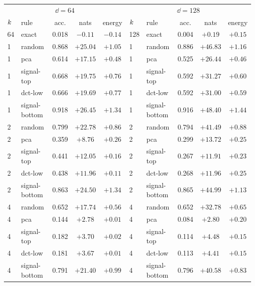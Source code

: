 \begin{center}
\small
\begin{tabular}{llccc|llccc}
\toprule
\multicolumn{5}{c|}{$\dd = 64$} & \multicolumn{5}{c}{$\dd = 128$} \\
$k$ & rule & acc. & nats & energy & $k$ & rule & acc. & nats & energy \\
\midrule
64 & exact         & 0.018 & $-0.11$ & $-0.14$ & 128 & exact         & 0.004 & $+0.19$ & $+0.15$ \\
\midrule
1 & random        & 0.868 & $+25.04$ & $+1.05$ & 1 & random        & 0.886 & $+46.83$ & $+1.16$ \\
1 & pca           & 0.614 & $+17.15$ & $+0.48$ & 1 & pca           & 0.525 & $+26.44$ & $+0.46$ \\
1 & signal-top    & 0.668 & $+19.75$ & $+0.76$ & 1 & signal-top    & 0.592 & $+31.27$ & $+0.60$ \\
1 & dct-low       & 0.666 & $+19.69$ & $+0.77$ & 1 & dct-low       & 0.592 & $+31.00$ & $+0.59$ \\
1 & signal-bottom & 0.918 & $+26.45$ & $+1.34$ & 1 & signal-bottom & 0.916 & $+48.40$ & $+1.44$ \\
\midrule
2 & random        & 0.799 & $+22.78$ & $+0.86$ & 2 & random        & 0.794 & $+41.49$ & $+0.88$ \\
2 & pca           & 0.359 & $+8.76$ & $+0.26$ & 2 & pca           & 0.299 & $+13.72$ & $+0.25$ \\
2 & signal-top    & 0.441 & $+12.05$ & $+0.16$ & 2 & signal-top    & 0.267 & $+11.91$ & $+0.23$ \\
2 & dct-low       & 0.438 & $+11.96$ & $+0.11$ & 2 & dct-low       & 0.268 & $+11.96$ & $+0.25$ \\
2 & signal-bottom & 0.863 & $+24.50$ & $+1.34$ & 2 & signal-bottom & 0.865 & $+44.99$ & $+1.13$ \\
\midrule
4 & random        & 0.652 & $+17.74$ & $+0.56$ & 4 & random        & 0.652 & $+32.78$ & $+0.65$ \\
4 & pca           & 0.144 & $+2.78$ & $+0.01$ & 4 & pca           & 0.084 & $+2.80$ & $+0.20$ \\
4 & signal-top    & 0.182 & $+3.70$ & $+0.02$ & 4 & signal-top    & 0.114 & $+4.48$ & $+0.15$ \\
4 & dct-low       & 0.181 & $+3.67$ & $+0.01$ & 4 & dct-low       & 0.113 & $+4.41$ & $+0.15$ \\
4 & signal-bottom & 0.791 & $+21.40$ & $+0.99$ & 4 & signal-bottom & 0.796 & $+40.58$ & $+0.83$ \\

\end{tabular}
\end{center}
